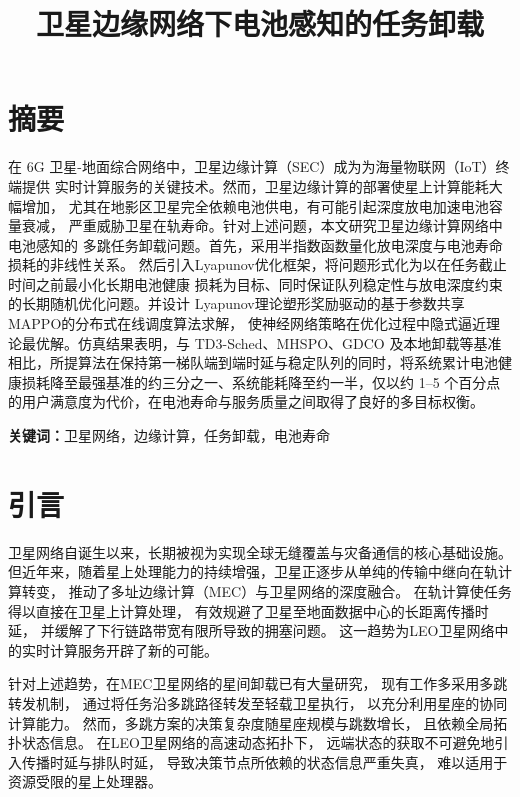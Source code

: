 \documentclass[a4paper,11pt]{article}
\begin{document}
\title{卫星边缘网络下电池感知的任务卸载}
\author{}
\date{}
\maketitle

\section{摘要}

在 6G 卫星-地面综合网络中，卫星边缘计算（SEC）成为为海量物联网（IoT）终端提供
实时计算服务的关键技术。然而，卫星边缘计算的部署使星上计算能耗大幅增加，
尤其在地影区卫星完全依赖电池供电，有可能引起深度放电加速电池容量衰减，
严重威胁卫星在轨寿命。针对上述问题，本文研究卫星边缘计算网络中电池感知的
多跳任务卸载问题。首先，采用半指数函数量化放电深度与电池寿命损耗的非线性关系。
然后引入Lyapunov优化框架，将问题形式化为以在任务截止时间之前最小化长期电池健康
损耗为目标、同时保证队列稳定性与放电深度约束的长期随机优化问题。并设计
Lyapunov理论塑形奖励驱动的基于参数共享MAPPO的分布式在线调度算法求解，
使神经网络策略在优化过程中隐式逼近理论最优解。仿真结果表明，与 TD3-Sched、MHSPO、GDCO 及本地卸载等基准相比，所提算法在保持第一梯队端到端时延与稳定队列的同时，将系统累计电池健康损耗降至最强基准的约三分之一、系统能耗降至约一半，仅以约 1--5 个百分点的用户满意度为代价，在电池寿命与服务质量之间取得了良好的多目标权衡。

\noindent\textbf{关键词：}卫星网络，边缘计算，任务卸载，电池寿命

\section{引言}

卫星网络自诞生以来，长期被视为实现全球无缝覆盖与灾备通信的核心基础设施。
但近年来，随着星上处理能力的持续增强，卫星正逐步从单纯的传输中继向在轨计算转变，
推动了多址边缘计算（MEC）与卫星网络的深度融合\cite{zhang2024mhspo}。
在轨计算使任务得以直接在卫星上计算处理，
有效规避了卫星至地面数据中心的长距离传播时延，
并缓解了下行链路带宽有限所导致的拥塞问题。
这一趋势为LEO卫星网络中的实时计算服务开辟了新的可能。

针对上述趋势，在MEC卫星网络的星间卸载已有大量研究，
现有工作多采用多跳转发机制，
通过将任务沿多跳路径转发至轻载卫星执行，
以充分利用星座的协同计算能力\cite{zhang2024mhspo}。
然而，多跳方案的决策复杂度随星座规模与跳数增长，
且依赖全局拓扑状态信息。
在LEO卫星网络的高速动态拓扑下，
远端状态的获取不可避免地引入传播时延与排队时延，
导致决策节点所依赖的状态信息严重失真，
难以适用于资源受限的星上处理器\cite{2}。
\end{document}
